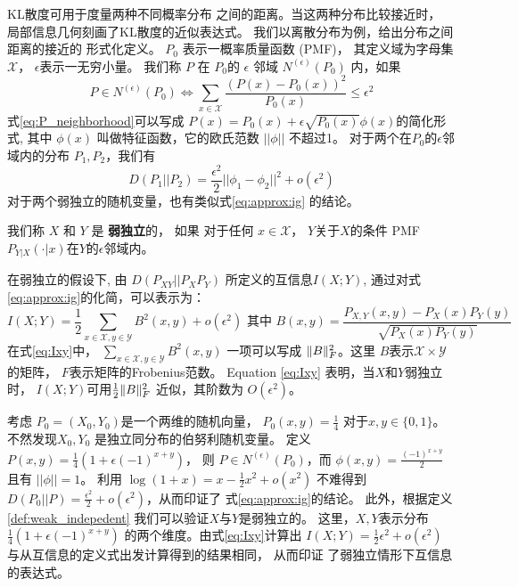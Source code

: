 KL散度可用于度量两种不同概率分布
之间的距离。当这两种分布比较接近时，
局部信息几何刻画了KL散度的近似表达式。
我们以离散分布为例，给出分布之间距离的接近的
形式化定义。
$P_0$ 表示一概率质量函数 (PMF)，
其定义域为字母集$\mathcal{X}$，
$\epsilon$表示一无穷小量。
我们称 $P$ 在 $P_0$的 $\epsilon$ 邻域 $N^{(\epsilon)}(P_0)$ 内，如果
\begin{equation}\label{eq:P_neighborhood}
P \in N^{(\epsilon)}(P_0) \iff
\sum_{x \in \mathcal{X}} \frac{(P(x) - P_0(x))^2}{P_0(x)} \leq \epsilon^2
\end{equation}
式\eqref{eq:P_neighborhood}可以写成 $P(x) = P_0(x) + \epsilon
\sqrt{P_0(x)} \phi(x)$的简化形式, 其中 $\phi(x)$
叫做特征函数，它的欧氏范数 $||\phi || $ 不超过1。
对于两个在$P_0$的$\epsilon$邻域内的分布 $P_1, P_2$，我们有
\begin{equation}\label{eq:approx:ig}
D(P_1 || P_2) = \frac{\epsilon^2}{2} ||\phi_1 - \phi_2||^2 + o(\epsilon^2)
\end{equation}
对于两个弱独立的随机变量，也有类似式\ref{eq:approx:ig}
的结论。
\begin{definition}\label{def:weak_indepedent}
我们称 $X$ 和 $Y$ 是 \textbf{弱独立}的，
如果 对于任何 $x \in \mathcal{X}$，
$Y$关于$X$的条件 PMF 
$P_{Y|X}(\cdot |x)$在$Y$的$\epsilon$邻域内。
\end{definition}
在弱独立的假设下, 由 $D(P_{XY}||P_XP_Y)$ 所定义的互信息$I(X;Y)$, 
通过对式\eqref{eq:approx:ig}的化简，可以表示为：
\begin{equation}\label{eq:Ixy}
I(X;Y) = \frac{1}{2}\sum_{x\in \mathcal{X}, y\in \mathcal{Y}} B^2(x,y) + o(\epsilon^2)
\textrm{ 其中 }  B(x,y)=\frac{P_{X,Y}(x,y) - P_X(x) P_Y(y)}{\sqrt{P_X(x)P_Y(y)}}
\end{equation}
在式\eqref{eq:Ixy}中， $\sum_{x\in \mathcal{X}, y\in \mathcal{Y}} B^2(x,y)$
一项可以写成 $\lVert B\rVert_F^2$。这里 $B$表示$\mathcal{X} \times \mathcal{Y}$的矩阵，
$F$表示矩阵的Frobenius范数。
Equation \eqref{eq:Ixy} 表明，当$X$和$Y$弱独立时，
$I(X;Y)$可用$\frac{1}{2} \lVert B\rVert_F^2$
近似，其阶数为 $O(\epsilon^2)$。

\begin{example}
考虑 $P_0=(X_0,Y_0)$是一个两维的随机向量，
$P_0(x,y)=\frac{1}{4}$ 对于$x,y \in \{0,1\}$。
不然发现$X_0,Y_0$
是独立同分布的伯努利随机变量。
定义 $P(x,y)=\frac{1}{4}(1+\epsilon (-1)^{x+y})$，
则 $P\in N^{(\epsilon)}(P_0)$，而
$\phi(x,y) = \frac{(-1)^{x+y}}{2}$
且有 $||\phi||=1$。
利用 $\log(1+x) = x - \frac{1}{2}x^2 + o(x^2)$
不难得到 $D(P_0||P)=\frac{\epsilon^2}{2}
+o(\epsilon^2)$，从而印证了
式\eqref{eq:approx:ig}的结论。
此外，根据定义\ref{def:weak_indepedent}
我们可以验证$X$与$Y$是弱独立的。
这里，$X,Y$表示分布$\frac{1}{4}(1+\epsilon (-1)^{x+y})$
的两个维度。由式\eqref{eq:Ixy}计算出
$I(X;Y)=\frac{1}{2}\epsilon^2+o(\epsilon^2)$
与从互信息的定义式出发计算得到的结果相同，
从而印证
了弱独立情形下互信息的表达式。
\end{example}
